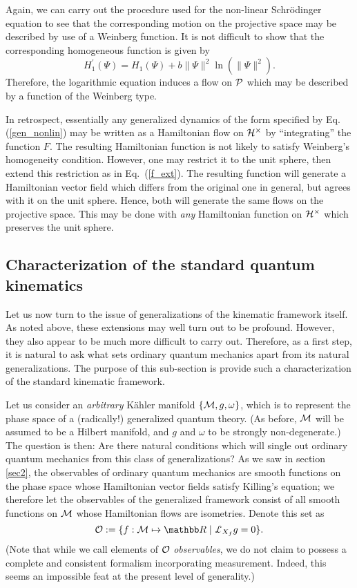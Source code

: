 \documentclass[12pt,aps,eqsecnum,tighten]{revtex4-2}
\def\be{\begin{equation}}
\def\ee{\end{equation}}
\def\punctH{{\cal H}^{\times}}
\def\P{{\cal P}}
\def\M{{\cal M}}
\def\w{\omega}
\newcommand{\eqn}[1]{Eq.~(\ref{#1})}
\newcommand{\lie}[1]{{\pounds}_{#1}}
\newcommand{\hvf}[1]{{X_{#1}}}
\def\R{\mathbb R}
\begin{document}
Again, we can carry out the procedure used for the non-linear
Schr\"odinger equation to see that the corresponding motion on the
projective space may be described by use of a Weinberg function.  It
is not difficult to show that the corresponding homogeneous function
is given by
%
\be
 H_1^\prime(\Psi) = H_1(\Psi) + b\|\Psi\|^2 \ln( \| \Psi \|^2 ).
\ee
%
Therefore, the logarithmic equation induces a flow on $\P$ which may
be described by a function of the Weinberg type.

In retrospect, essentially any generalized dynamics of the form
specified by Eq. (\ref{gen_nonlin}) may be written as a Hamiltonian
flow on $\punctH$ by ``integrating'' the function $F$.  The resulting
Hamiltonian function is not likely to satisfy Weinberg's homogeneity
condition.  However, one may restrict it to the unit sphere, then
extend this restriction as in \eqn{f_ext}.  The resulting function
will generate a Hamiltonian vector field which differs from the
original one in general, but agrees with it on the unit sphere.
Hence, both will generate the same flows on the projective space.
This may be done with {\em any} Hamiltonian function on $\punctH$
which preserves the unit sphere.




\subsection{Characterization of the standard quantum kinematics}
\label{sec3.B}					

Let us now turn to the issue of generalizations of the kinematic
framework itself. As noted above, these extensions may well turn out
to be profound. However, they also appear to be much more difficult to
carry out. Therefore, as a first step, it is natural to ask what sets
ordinary quantum mechanics apart from its natural generalizations.
The purpose of this sub-section is provide such a characterization of
the standard kinematic framework.

Let us consider an {\em arbitrary} K\"ahler manifold $\{ \M, g, \w
\}$, which is to represent the phase space of a (radically!)
generalized quantum theory. (As before, $\M$ will be assumed to be a
Hilbert manifold, and $g$ and $\w$ to be strongly non-degenerate.)
The question is then: Are there natural conditions which
will single out ordinary quantum mechanics from this class of
generalizations?  As we saw in section \ref{sec2}, the observables of
ordinary quantum mechanics are smooth functions on the phase space
whose Hamiltonian vector fields satisfy Killing's equation; we
therefore let the observables of the generalized framework consist of
all smooth functions on $\M$ whose Hamiltonian flows are
isometries. Denote this set as
%
\be
  {\cal O} := \{ f: \M \mapsto \R \; | \; \lie{\hvf{f}} g = 0 \}.
\ee
%
(Note that while we call elements of ${\cal O}$ {\em observables},
we do not claim to possess a complete and consistent formalism
incorporating measurement. Indeed, this seems an impossible feat at
the present level of generality.)
\end{document}
